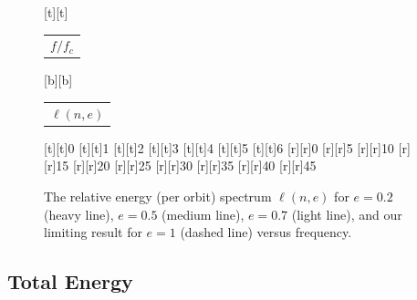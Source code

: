 \documentclass[aps,prd,amsfonts,amssymb,amsmath,nofootinbib,floatfix,reprint,showpacs,groupedaddress]{revtex4-1}
\begin{document}
\begin{figure}
\begin{psfrags}%
\psfragscanon%
%
[t][t]{\color[rgb]{0,0,0}\setlength{\tabcolsep}{0pt}\begin{tabular}{c}{\Large$f/f_{c}$}\end{tabular}}%
[b][b]{\color[rgb]{0,0,0}\setlength{\tabcolsep}{0pt}\begin{tabular}{c}{\Large$\ell(n,e)$}\end{tabular}}%
%
[t][t]{0}%
[t][t]{1}%
[t][t]{2}%
[t][t]{3}%
[t][t]{4}%
[t][t]{5}%
[t][t]{6}%
%
[r][r]{0}%
[r][r]{5}%
[r][r]{10}%
[r][r]{15}%
[r][r]{20}%
[r][r]{25}%
[r][r]{30}%
[r][r]{35}%
[r][r]{40}%
[r][r]{45}%
%
%
\end{psfrags}%
\caption{The relative energy (per orbit) spectrum $\ell(n,e)$ for $e = 0.2$ (heavy line), $e = 0.5$ (medium line), $e = 0.7$ (light line), and our limiting result for $e = 1$ (dashed line) versus frequency.\label{fig:ell}}
\end{figure}

\subsection{Total Energy}
\end{document}
